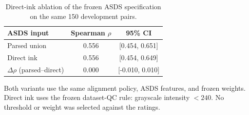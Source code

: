 \begin{table}[t]
\caption{Direct-ink ablation of the frozen ASDS specification on the same 150 development pairs.}
\label{tab:direct-ink-asds}
\centering
\begin{tabular}{@{}lcc@{}}
\toprule
ASDS input & Spearman $\rho$ & 95\% CI \\
\midrule
Parsed union & 0.556 & [0.454, 0.651] \\
Direct ink & 0.556 & [0.454, 0.649] \\
\midrule
$\Delta\rho$ (parsed--direct) & 0.000 & [-0.010, 0.010] \\
\bottomrule
\end{tabular}
\parbox{0.86\columnwidth}{\footnotesize\raggedright
Both variants use the same alignment policy, ASDS features, and frozen
weights. Direct ink uses the frozen dataset-QC rule: grayscale intensity
$<240$. No threshold or weight was selected against the ratings.}
\end{table}
